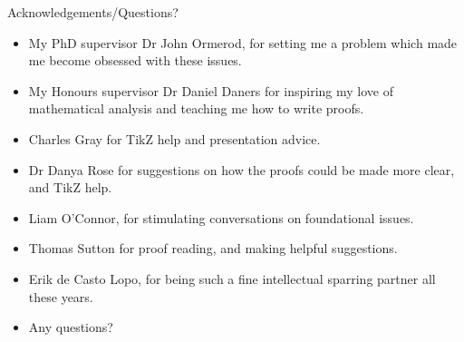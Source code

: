 \documentclass{beamer}
\begin{document}

\begin{frame}{Acknowledgements/Questions?}
\begin{itemize}
\item My PhD supervisor Dr John Ormerod, for setting me a problem which made me become obsessed with these
			issues.
\item My Honours supervisor Dr Daniel Daners for inspiring my love of mathematical analysis and teaching
			me how to write proofs.
\item Charles Gray for TikZ help and presentation advice.
\item Dr Danya Rose for suggestions on how the proofs could be made more clear, and TikZ help.
\item Liam O'Connor, for stimulating conversations on foundational issues.
\item Thomas Sutton for proof reading, and making helpful suggestions.
\item Erik de Casto Lopo, for being such a fine intellectual sparring partner all these years.
\item Any questions?
\end{itemize}
\end{frame}
\end{document}

